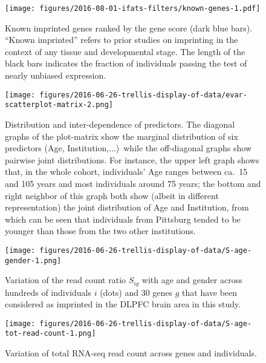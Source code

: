 \documentclass[12pt,letterpaper]{article}
\begin{document}
\begin{figure}[h]
\begin{center}
\texttt{[image: figures/2016-08-01-ifats-filters/known-genes-1.pdf]}
\caption{Known imprinted genes ranked by the gene score (dark blue bars).
``Known imprinted'' refers to prior studies on imprinting in the context of
any tissue and developmental stage.  The length of the
black bars indicates the fraction of individuals passing the test of nearly
unbiased expression.}
\label{fig:known-genes}
\end{center}
\end{figure}

\begin{figure}[h]
\begin{center}
\texttt{[image: figures/2016-06-26-trellis-display-of-data/evar-scatterplot-matrix-2.png]}
\end{center}
\caption{
Distribution and inter-dependence of predictors.  The diagonal graphs of the
plot-matrix show the marginal distribution of six predictors (Age,
Institution,...)~while the off-diagonal graphs show pairwise joint
distributions.  For instance, the upper left graph shows that, in the whole
cohort, individuals' Age
ranges between ca.~15 and 105 years and most individuals around 75 years; the
bottom and right neighbor of this graph both show (albeit in different
representation) the joint distribution of Age and Institution, from which can
be seen that individuals from Pittsburg tended to be younger than those from
the two other institutions.
}
\label{fig:predictor-associations}
\end{figure}

\begin{figure}[h]
\begin{center}
\texttt{[image: figures/2016-06-26-trellis-display-of-data/S-age-gender-1.png]}
\caption{
Variation of the read count ratio \(S_{ig}\) with age and gender across hundreds of individuals
\(i\) (dots) and 30 genes \(g\) that have been considered as imprinted in the DLPFC
brain area in this study.
}
\label{fig:S-age-gender}
\end{center}
\end{figure}

\begin{figure}[h]
\begin{center}
\texttt{[image: figures/2016-06-26-trellis-display-of-data/S-age-tot-read-count-1.png]}
\end{center}
\caption{Variation of total RNA-seq read count across genes and individuals.}
\label{fig:weight-of-evidence}
\end{figure}
\end{document}
